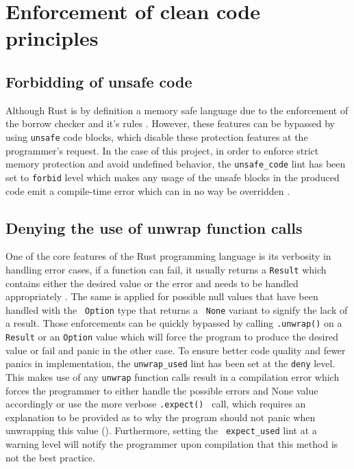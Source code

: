 \section{Enforcement of clean code principles}
\label{clean_code}

    \subsection{Forbidding of unsafe code}

    Although Rust is by definition a memory safe language due to the enforcement of the borrow checker and it's rules \cite{klabnik_rust_2023}. However, these features can be bypassed by using \verb|unsafe| code blocks, which disable these protection features at the programmer's request.
    In the case of this project, in order to enforce strict memory protection and avoid undefined behavior, the \verb|unsafe_code| lint has been set to \verb|forbid| level which makes any usage of the unsafe blocks in the produced code emit a compile-time error which can in no way be overridden \cite{klabnik_rust_2023}.

    \subsection{Denying the use of unwrap function calls}

    One of the core features of the Rust programming language is its verbosity in handling error cases, if a function can fail, it usually returns a \verb|Result| which contains either the desired value or the error and needs to be handled appropriately \cite{klabnik_recoverable_2023}. The same is applied for possible null values that have been handled with the \verb| Option| type that returns a \verb| None| variant to signify the lack of a result.
    Those enforcements can be quickly bypassed by calling \verb|.unwrap()| on a \verb|Result| or an \verb|Option| value which will force the program to produce the desired value or fail and panic in the other case.
    To ensure better code quality and fewer panics in implementation, the \verb|unwrap_used| lint has been set at the \verb|deny| level.
    This makes use of any \verb|unwrap| function calls result in a compilation error which forces the programmer to either handle the possible errors and None value accordingly or use the more verbose \verb|.expect() | call, which requires an explanation to be provided as to why the program should not panic when unwrapping this value (\cite{klabnik_recoverable_2023}).
    Furthermore, setting the \verb| expect_used| lint at a warning level will notify the programmer upon compilation that this method is not the best practice.

